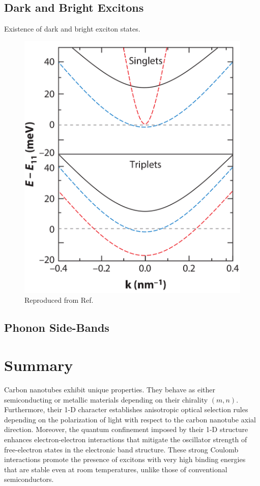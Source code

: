 \subsection{Dark and Bright Excitons}

Existence of dark and bright exciton states.

\begin{figure}[ht]
	\centering
	\includegraphics[scale=0.3]{images/chapter_optical_props/dark_and_bright_excitons}
	\caption{Reproduced from Ref.\ \cite{amori2018excitons}}
\end{figure}

\subsection{Phonon Side-Bands}


\section{Summary}

Carbon nanotubes exhibit unique properties. They behave as either semiconducting or metallic materials depending on their chirality $(m,n)$. Furthermore, their 1-D character establishes anisotropic optical selection rules depending on the polarization of light with respect to the carbon nanotube axial direction. Moreover, the quantum confinement imposed by their 1-D structure enhances electron-electron interactions that mitigate the oscillator strength of free-electron states in the electronic band structure. These strong Coulomb interactions promote the presence of excitons with very high binding energies that are stable even at room temperatures, unlike those of conventional semiconductors.
